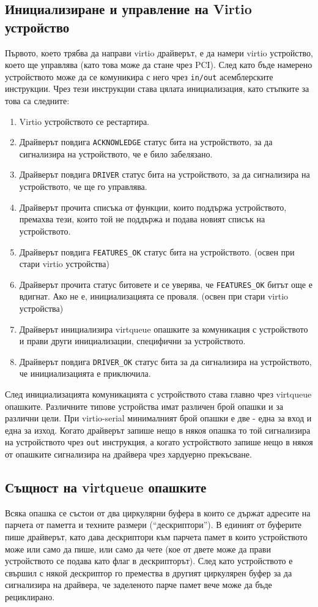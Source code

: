   \subsection{Инициализиране и управление на Virtio устройство} \label{virtioinit}
  Първото, което трябва да направи virtio драйверът, е да намери virtio устройство, което ще управлява (като това може да стане чрез PCI). След като бъде намерено устройството може да се комуникира с него чрез {\tt in/out} асемблерските инструкции. Чрез тези инструкции става цялата инициализация, като стъпките за това са следните:
  \begin{enumerate}
    \item Virtio устройството се рестартира.
    \item Драйверът повдига {\tt ACKNOWLEDGE} статус бита на устройството, за да сигнализира на устройството, че е било забелязано.
    \item Драйверът повдига {\tt DRIVER} статус бита на устройството, за да сигнализира на устройството, че ще го управлява.
    \item Драйверът прочита списъка от функции, които поддържа устройството, премахва тези, които той не поддържа и подава новият списък на устройството.
    \item Драйверът повдига {\tt FEATURES\_OK} статус бита на устройството. (освен при стари virtio устройства)
    \item Драйверът прочита статус битовете и се уверява, че {\tt FEATURES\_OK} битът още е вдигнат. Ако не е, инициализацията се проваля. (освен при стари virtio устройства)
    \item Драйверът инициализира virtqueue опашките за комуникация с устройството и прави други инициализации, специфични за устройството.
    \item Драйверът повдига {\tt DRIVER\_OK} статус бита за да сигнализира на устройството, че инициализацията е приключила.
  \end{enumerate}

  След инициализацията комуникацията с устройството става главно чрез virtqueue опашките. Различните типове устройства имат различен брой опашки и за различни цели. При virtio-serial минималният брой опашки е две - една за вход и една за изход. Когато драйверът запише нещо в някоя опашка то той сигнализира на устройството чрез {\tt out} инструкция, а когато устройството запише нещо в някоя от опашките сигнализира на драйвера чрез хардуерно прекъсване.

  \subsection{Същност на virtqueue опашките}
  Всяка опашка се състои от два циркулярни буфера в които се държат адресите на парчета от паметта и техните размери (``дескриптори''). В единият от буферите пише драйверът, като дава дескриптори към парчета памет в които устройството може или само да пише, или само да чете (кое от двете може да прави устройството се подава като флаг в дескрипторът). След като устройството е свършил с някой дескриптор го премества в другият циркулярен буфер за да сигнализира на драйвера, че заделеното парче памет вече може да бъде рециклирано.

